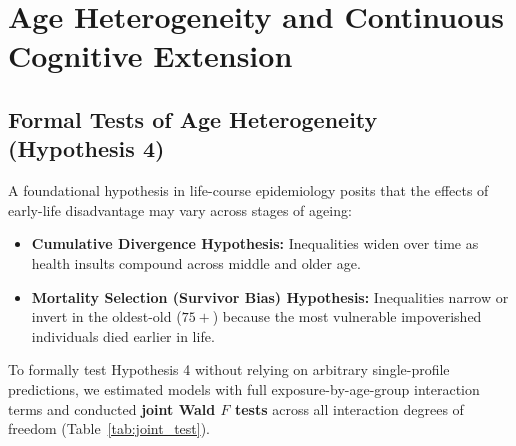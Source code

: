 
\section{Age Heterogeneity and Continuous Cognitive Extension}

\subsection{Formal Tests of Age Heterogeneity (Hypothesis 4)}
A foundational hypothesis in life-course epidemiology posits that the effects of early-life disadvantage may vary across stages of ageing:
\begin{itemize}
    \item \textbf{Cumulative Divergence Hypothesis:} Inequalities widen over time as health insults compound across middle and older age.
    \item \textbf{Mortality Selection (Survivor Bias) Hypothesis:} Inequalities narrow or invert in the oldest-old ($75+$) because the most vulnerable impoverished individuals died earlier in life.
\end{itemize}

To formally test Hypothesis 4 without relying on arbitrary single-profile predictions, we estimated models with full exposure-by-age-group interaction terms and conducted \textbf{joint Wald $F$ tests} across all interaction degrees of freedom (Table~\ref{tab:joint_test}).

